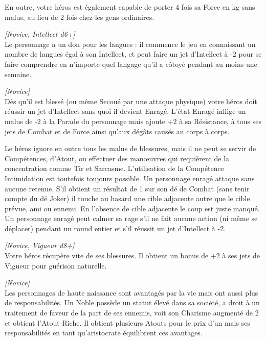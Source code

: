 \begin{description}[align=left]
		En outre, votre héros est également capable de porter 4 fois sa Force en kg sans malus, au lieu de 2 fois chez les gens ordinaires.

    \item [Don des langues]
    	\emph{[Novice, Intellect d6+]}\\
        Le personnage a un don pour les langues : il commence le jeu en connaissant un nombre de langues égal à son Intellect, et peut faire un jet d’Intellect à -2 pour se faire comprendre en n’importe quel langage qu’il a côtoyé pendant au moins une semaine.

    \item [Enragé]
    	\emph{[Novice]}\\
        Dès qu’il est blessé (ou même Secoué par une attaque physique) votre héros doit réussir un jet d’Intellect sans quoi il devient Enragé. L’état Enragé inflige un malus de -2 à la Parade du personnage mais ajoute +2 à sa Résistance, à tous ses jets de Combat et de Force ainsi qu’aux dégâts causés au corps à corps.

        Le héros ignore en outre tous les malus de blessures, mais il ne peut se servir de Compétences, d’Atout, ou effectuer des man\oe{uvres} qui requièrent de la concentration comme Tir et Sarcasme. L’utilisation de la Compétence Intimidation est toutefois toujours possible. Un personnage enragé attaque sans aucune retenue. S’il obtient un résultat de 1 sur son dé de Combat (sans tenir compte du dé Joker) il touche au hasard une cible adjacente autre que le cible prévue, ami ou ennemi. En l’absence de cible adjacente le coup est juste manqué. Un personnage enragé peut calmer sa rage s’il ne fait aucune action (ni même se déplacer) pendant un round entier et s’il réussit un jet d’Intellect à -2.

    \item [Guérison rapide]
    	\emph{[Novice, Vigueur d8+]}\\
        Votre héros récupère vite de ses blessures. Il obtient un bonus de +2 à ses jets de Vigueur pour guérison naturelle.

    \item [Noble]
    	\emph{[Novice]}\\
        Les personnages de haute naissance sont avantagés par la vie mais ont aussi plus de responsabilités. Un Noble possède un statut élevé dans sa société, a droit à un traitement de faveur de la part de ses ennemis, voit son Charisme augmenté de 2 et obtient l’Atout Riche. Il obtient plusieurs Atouts pour le prix d’un mais ses responsabilités en tant qu’aristocrate équilibrent ces avantages. 


\end{description}
